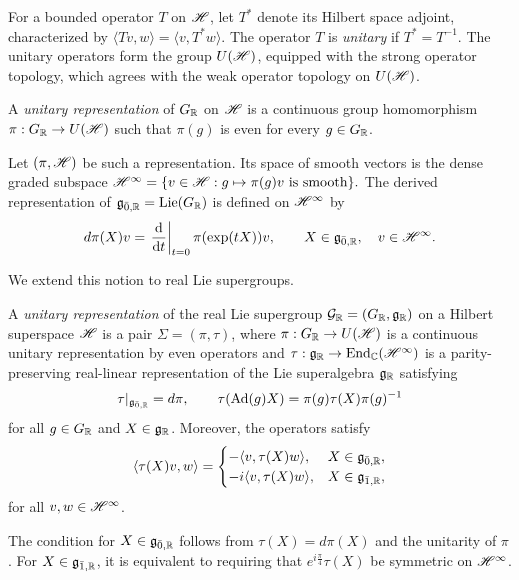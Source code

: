 For a bounded operator $T$ on ${\mathscr{H}}$, let $T^{\ast}$ denote its Hilbert space adjoint, characterized by
$
\langle Tv,w\rangle=\langle v,T^{\ast}w\rangle.
$
The operator $T$ is \emph{unitary} if $T^{\ast}=T^{-1}$. The unitary operators form the group $U({\mathscr{H}})$, equipped with the strong operator topology, which agrees with the weak operator topology on $U({\mathscr{H}})$.

A \emph{unitary representation} of $G_{{\mathbb R}}$ on ${\mathscr{H}}$ is a continuous group homomorphism
$
\pi:G_{{\mathbb R}}\to U({\mathscr{H}})
$
such that $\pi(g)$ is even for every $g\in G_{{\mathbb R}}$.

Let $(\pi,{\mathscr{H}})$ be such a representation. Its space of smooth vectors is the dense graded subspace
$
{\mathscr{H}}^\infty
=
\{v\in{\mathscr{H}}:g\mapsto\pi(g)v\text{ is smooth}\}.
$
The derived representation of ${\mathfrak{g}}_{\bar0,{\mathbb R}}=\operatorname{Lie}(G_{{\mathbb R}})$ is defined on ${\mathscr{H}}^\infty$ by
\begin{equation}
d\pi(X)v
=
\left.
\frac{\mathrm d}{\mathrm dt}
\right|_{t=0}
\pi(\exp(tX))v,
\qquad
X\in{\mathfrak{g}}_{\bar0,{\mathbb R}},\quad v\in{\mathscr{H}}^\infty.
\end{equation}

We extend this notion to real Lie supergroups.

\begin{definition}
A \emph{unitary representation} of the real Lie supergroup ${\mathcal{G}}_{{\mathbb R}}=(G_{{\mathbb R}},{\mathfrak{g}}_{{\mathbb R}})$ on a Hilbert superspace ${\mathscr{H}}$ is a pair $\Sigma=(\pi,\tau)$, where $\pi:G_{{\mathbb R}}\to U({\mathscr{H}})$ is a continuous unitary representation by even operators and
$
\tau:{\mathfrak{g}}_{{\mathbb R}}\to\operatorname{End}_{{\mathbb C}}({\mathscr{H}}^\infty)
$
is a parity-preserving real-linear representation of the Lie superalgebra ${\mathfrak{g}}_{{\mathbb R}}$ satisfying
\begin{equation*}
\tau|_{{\mathfrak{g}}_{\bar0,{\mathbb R}}}=d\pi,
\qquad
\tau(\operatorname{Ad}(g)X)=\pi(g)\tau(X)\pi(g)^{-1}
\end{equation*}
for all $g\in G_{{\mathbb R}}$ and $X\in{\mathfrak{g}}_{{\mathbb R}}$. Moreover, the operators satisfy
\begin{equation*}
\langle\tau(X)v,w\rangle
=
\begin{cases}
-\langle v,\tau(X)w\rangle,
& X\in{\mathfrak{g}}_{\bar0,{\mathbb R}},\\
-i\langle v,\tau(X)w\rangle,
& X\in{\mathfrak{g}}_{\bar1,{\mathbb R}},
\end{cases}
\end{equation*}
for all $v,w\in{\mathscr{H}}^\infty$.
\end{definition}

\begin{remark}
The condition for $X\in{\mathfrak{g}}_{\bar0,{\mathbb R}}$ follows from $\tau(X)=d\pi(X)$ and the unitarity of $\pi$. For $X\in{\mathfrak{g}}_{\bar1,{\mathbb R}}$, it is equivalent to requiring that $e^{i\tfrac{\pi}{4}}\tau(X)$ be symmetric on ${\mathscr{H}}^\infty$.
\end{remark}

